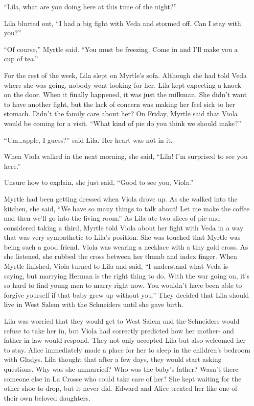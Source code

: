 \documentclass[
  letterpaper,
]{book}
\begin{document}
``Lila, what are you doing here at this time of the night?''

Lila blurted out, ``I had a big fight with Veda and stormed off. Can I
stay with you?''

``Of course,'' Myrtle said. ``You must be freezing. Come in and I'll
make you a cup of tea.''

For the rest of the week, Lila slept on Myrtle's sofa. Although she had
told Veda where she was going, nobody went looking for her. Lila kept
expecting a knock on the door. When it finally happened, it was just the
milkman. She didn't want to have another fight, but the lack of concern
was making her feel sick to her stomach. Didn't the family care about
her? On Friday, Myrtle said that Viola would be coming for a visit.
``What kind of pie do you think we should make?''

``Um\ldots apple, I guess?'' said Lila. Her heart was not in it.

When Viola walked in the next morning, she said, ``Lila! I'm surprised
to see you here.''

Unsure how to explain, she just said, ``Good to see you, Viola.''

Myrtle had been getting dressed when Viola drove up. As she walked into
the kitchen, she said, ``We have so many things to talk about! Let me
make the coffee and then we'll go into the living room.'' As Lila ate
two slices of pie and considered taking a third, Myrtle told Viola about
her fight with Veda in a way that was very sympathetic to Lila's
position. She was touched that Myrtle was being such a good friend.
Viola was wearing a necklace with a tiny gold cross. As she listened,
she rubbed the cross between her thumb and index finger. When Myrtle
finished, Viola turned to Lila and said, ``I understand what Veda is
saying, but marrying Herman is the right thing to do. With the war going
on, it's so hard to find young men to marry right now. You wouldn't have
been able to forgive yourself if that baby grew up without you.'' They
decided that Lila should live in West Salem with the Schneiders until
she gave birth.

Lila was worried that they would get to West Salem and the Schneiders
would refuse to take her in, but Viola had correctly predicted how her
mother- and father-in-law would respond. They not only accepted Lila but
also welcomed her to stay. Alice immediately made a place for her to
sleep in the children's bedroom with Gladys. Lila thought that after a
few days, they would start asking questions. Why was she unmarried? Who
was the baby's father? Wasn't there someone else in La Crosse who could
take care of her? She kept waiting for the other shoe to drop, but it
never did. Edward and Alice treated her like one of their own beloved
daughters.
\end{document}
